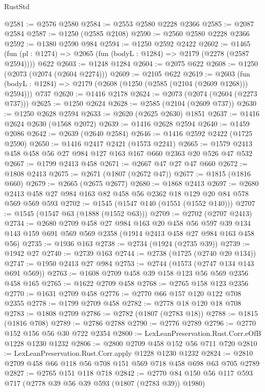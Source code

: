 \begin{lexlean}{RustStd}
\begin{coremodule}
@2581 := @2576 @2580
@2584 := @2553 @2580 @2228 @2366
@2585 := @2087 @2584
@2587 := @1250 (@2585 @2108)
@2590 := @2560 @2580 @2228 @2366
@2592 := @1380 @2590 @984
@2594 := @1250 @2592 @2422
@2602 := @1465 (fun (pl : @1274) => @2065 (fun (bodyL : @1284) => @2179 (@2278 (@2587 @2594)))) @622
@2603 := @1248 @1284
@2604 := @2075 @622
@2608 := @1250 (@2073 (@2074 (@2604 @2274)))
@2609 := @2105 @622
@2619 := @2603
    (fun (bodyL : @1284) => @2179 (@2608 (@1250 (@2585 (@2104 (@2609 @1268))) @2594)))
    @737
@2620 := @1416 @2178
@2624 := @2073 (@2074 (@2604 (@2273 @737)))
@2625 := @1250 @2624
@2628 := @2585 (@2104 (@2609 @737))
@2630 := @1250 @2628 @2594
@2633 := @2620 (@2625 @2630) @1851
@2637 := @1416 @2624 @2630 (@1568 @2072)
@2639 := @1416 @2628 @2594
@2640 := @1459 @2086
@2642 := @2639 (@2640 @2584)
@2646 := @1416 @2592 @2422 (@1725 @2590)
@2650 := @1416 @2417 @2421 (@1573 @2241)
@2665 := @1579 @2413 @458 @458 @56 @27 @984 @127 @163 @167 @660 @2363 @20 @526 @47 @532
@2667 := @1799 @2413 @458
@2671 := @2667 @47 @27 @47 @660
@2672 := @1808 @2413
@2675 := @2671 (@1807 (@2672 @47))
@2677 := @1815 (@1816 @660)
@2679 := @2665 (@2675 @2677)
@2680 := @1868 @2413
@2697 := @2680 @2413 @458 @27 @984 @163 @82 @458 @56 @2362 @18 @129 @20 @84 @578 @569 @569 @593
@2702 := @1545 (@1547 @140 (@1551 (@1552 @140)))
@2707 := @1545 (@1547 @63 (@1888 (@1552 @63)))
@2709 := @2702 (@2707 @2413)
@2734 := @2680
    @2709
    @458
    @27
    @984
    @163
    @20
    @458
    @56
    @597
    @39
    @134
    @143
    @159
    @691
    @569
    @569
    @2358
    (@1914 @2413 @458 @27 @984 @163 @458 @56)
@2735 := @1936 @163
@2738 := @2734 (@1924 (@2735 @39))
@2739 := @1942 @27
@2740 := @2739 @163
@2744 := @2738 (@1725 (@2740 @20 @134))
@2747 := @1950 @2413 @27 @984
@2753 := @2744 (@1573 (@2747 @134 @143 @691 @569))
@2763 := @1608 @2709 @458 @39 @158 @123 @56 @569 @2356 @458 @165
@2765 := @1622 @2709 @458
@2768 := @2765 @158 @123 @2356
@2770 := @1631 @2709 @458
@2776 := @2770 @66 @157 @120 @122 @708 @2355
@2778 := @1799 @2709 @458
@2782 := @2778 @18 @120 @18 @708
@2783 := @1808 @2709
@2786 := @2782 (@1807 (@2783 @18))
@2788 := @1815 (@1816 @708)
@2789 := @2786 @2788
@2790 := @2776 @2789
@2796 := @2770 @152 @156 @56 @30 @722 @2354
@2800 := LexLeanPreservation.Rust.Corr.eOfB @1228 @1230 @1232
@2806 := @2800 @2709 @458 @152 @56 @711 @720
@2810 := LexLeanPreservation.Rust.Corr.apply @1228 @1230 @1232
@2824 := @2810 @2709 @458 @66 @118 @56 @708 @151 @569 @718 @458 @698 @63 @705 @2789
@2827 := @2765 @151 @118 @718
@2842 := @2770 @84 @150 @56 @117 @593 @717 (@2778 @39 @56 @39 @593 (@1807 (@2783 @39)) @1980)

\end{coremodule}
\end{lexlean}
